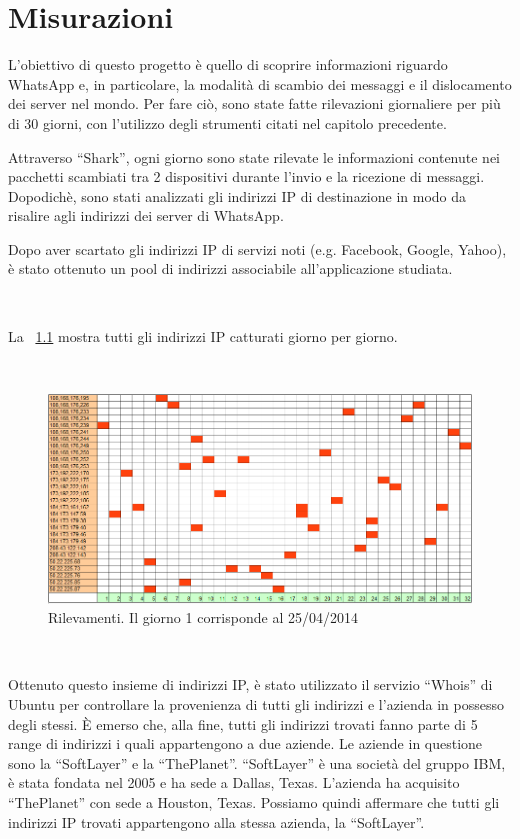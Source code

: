 \documentclass[a4paper,11pt]{book}
\begin{document}
\chapter{Misurazioni}

L'obiettivo di questo progetto \`e quello di scoprire informazioni riguardo WhatsApp e, in particolare, la modalità di scambio dei messaggi e il dislocamento dei server nel mondo.
Per fare ci\`o, sono state fatte rilevazioni giornaliere per pi\`u di 30 giorni, con l'utilizzo degli strumenti citati nel capitolo precedente.

Attraverso ``Shark'', ogni giorno sono state rilevate le informazioni contenute nei pacchetti scambiati tra 2 dispositivi durante l'invio e la ricezione di messaggi.
Dopodich\`e, sono stati analizzati gli indirizzi IP di destinazione in modo da risalire agli indirizzi dei server di WhatsApp.

Dopo aver scartato gli indirizzi IP di servizi noti (e.g. Facebook, Google, Yahoo), è stato ottenuto un pool di indirizzi associabile all'applicazione studiata.

~

La \figurename ~\ref{fig:rilevazioni} mostra tutti gli indirizzi IP catturati giorno per giorno.  

~

\begin{figure}[!ht]
\centering
\includegraphics[scale = 0.7]{rilevazioni_30gg.png}
\caption{Rilevamenti. Il giorno 1 corrisponde al 25/04/2014}
\label{fig:rilevazioni}
\end{figure}

~

Ottenuto questo insieme di indirizzi IP, \`e stato utilizzato il servizio ``Whois'' di Ubuntu per controllare la provenienza di tutti gli indirizzi e l'azienda in possesso degli stessi.
\`E emerso che, alla fine, tutti gli indirizzi trovati fanno parte di 5 range di indirizzi i quali appartengono a due aziende. Le aziende in questione sono la ``SoftLayer'' e la ``ThePlanet''.
``SoftLayer'' \`e una societ\`a del gruppo IBM, \`e stata fondata nel 2005 e ha sede a Dallas, Texas. L'azienda ha acquisito ``ThePlanet'' con sede a Houston, Texas. 
Possiamo quindi affermare che tutti gli indirizzi IP trovati appartengono alla stessa azienda, la ``SoftLayer''.
\end{document}

